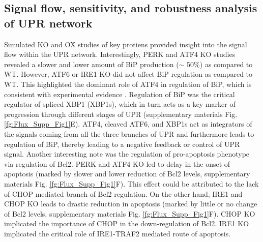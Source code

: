 \documentclass[fleqn,10pt]{wlscirep}
\begin{document}
\subsection*{Signal flow, sensitivity, and robustness analysis of UPR network}
Simulated KO and OX studies of key protiens provided insight into the signal flow within the UPR network. Interestingly, PERK and ATF4 KO studies revealed a slower and lower amount of BiP production ($\sim$ 50\%) as compared to WT. However, ATF6 or IRE1 KO did not affect BiP regulation as compared to WT. This highlighted the dominant role of ATF4 in regulation of BiP, which is consistent with experimental evidence \cite{ma2003delineation}. Regulation of BiP was the critical regulator of spliced XBP1 (XBP1s), which in turn acts as a key marker of progression through different stages of UPR (supplementary materials Fig. \ref{fg:Flux_Supp_Fig1}E). ATF4, cleaved ATF6, and XBP1s act as integrators of the signals coming from all the three branches of UPR and furthermore leads to regulation of BiP, thereby leading to a negative feedback or control of UPR signal. Another interesting note was the regulation of pro-apoptosis phenotype via regulation of Bcl2. PERK and ATF4 KO led to delay in the onset of apoptosis (marked by slower and lower reduction of Bcl2 levels, supplementary materials Fig. \ref{fg:Flux_Supp_Fig1}F). This effect could be attributed to the lack of CHOP mediated branch of Bcl2 regulation. On the other hand, IRE1 and CHOP KO leads to drastic reduction in apoptosis (marked by little or no change of Bcl2 levels, supplementary materials Fig. \ref{fg:Flux_Supp_Fig1}F). CHOP KO implicated the importance of CHOP in the down-regulation of Bcl2. IRE1 KO implicated the critical role of IRE1-TRAF2 mediated route of apoptosis.
\end{document}
